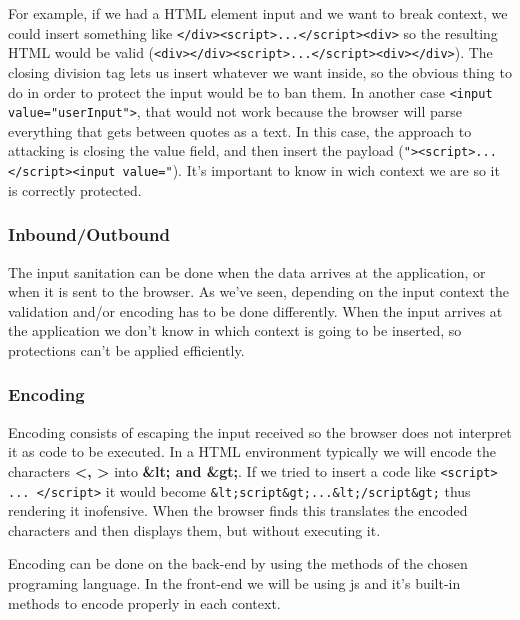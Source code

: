 For example, if we had a HTML element input  and we want to break context, we could insert something like \verb|</div><script>...</script><div>| so the resulting HTML would be valid (\verb|<div></div><script>...</script><div></div>|). The closing division tag lets us insert whatever we want inside, so the obvious thing to do in order to protect the input would be to ban them. In another case \verb|<input value="userInput">|, that would not work because the browser will parse everything that gets between quotes as a text. In this case, the approach to attacking is closing the value field, and then insert the payload (\verb|"><script>...</script><input value="|). It's important to know in wich context we are so it is correctly protected.

\subsubsection{Inbound/Outbound}
The input sanitation can be done when the data arrives at the application, or when it is sent to the browser. As we've seen, depending on the input context the validation and/or encoding has to be done differently. When the input arrives at the application we don't know in which context is going to be inserted, so protections can't be applied efficiently.

\subsubsection{Encoding}
Encoding consists of escaping the input received so the browser does not interpret it as code to be executed. In a HTML environment typically we will encode the characters \textbf{<, >} into \textbf{\&lt; and \&gt;}. If we tried to insert a code like \verb|<script> ... </script>| it would become \verb|&lt;script&gt;...&lt;/script&gt;| thus rendering it inofensive. When the browser finds this translates the encoded characters and then displays them, but without executing it.

Encoding can be done on the back-end by using the methods of the chosen programing language. In the front-end we will be using js and it's built-in methods to encode properly in each context.


